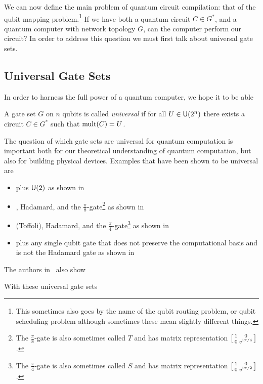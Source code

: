 We can now define the main problem of quantum circuit compilation: that of the qubit mapping problem.\footnote{This sometimes also goes by the name of the qubit routing problem, or qubit scheduling problem although sometimes these mean slightly different things.}
If we have both a quantum circuit $C\in G^*$, and a quantum computer with network topology $G$, can the computer perform our circuit?
In order to address this question we must first talk about universal gate sets.

\subsection{Universal Gate Sets}
In order to harness the full power of a quantum computer, we hope it to be able
\begin{definition}
    A gate set $G$ on $n$ qubits is called \emph{universal} if for all $U\in\mathsf{U} (2^n)$ there exists a circuit $C\in G^*$ such that $\operatorname{mult}(C) = U$.
\end{definition}

The question of which gate sets are universal for quantum computation is important both for our theoretical understanding of quantum computation, but also for building physical devices.
Examples that have been shown to be universal are
\begin{itemize}
    \item \CNOT{} plus $\mathsf{U} (2)$ as shown in~\cite{universal-cnot-u2}
    \item \CNOT{}, Hadamard, and the $\frac{\pi}{8}$-gate\footnote{The $\frac{\pi}{8}$-gate is also sometimes called $T$ and has matrix representation $\smqty[1 & 0 \\ 0 & \e^{\iu\pi/4}]$.} as shown in~\cite{universal-cnot-had-p8}
    \item \CCNOT{} (Toffoli), Hadamard, and the $\frac{\pi}{4}$-gate\footnote{The $\frac{\pi}{4}$-gate is also sometimes called $S$ and has matrix representation $\smqty[1 & 0 \\ 0 & \e^{\iu\pi/2}]$.} as shown in~\cite{universal-ccnot-had-p4}
    \item \CNOT{} plus any single qubit gate that does not preserve the computational basis and is not the Hadamard gate as shown in~\cite{universal-cnot-basis-change}
\end{itemize}

The authors in~\cite{universal-cnot-u2} also show

With these universal gate sets


